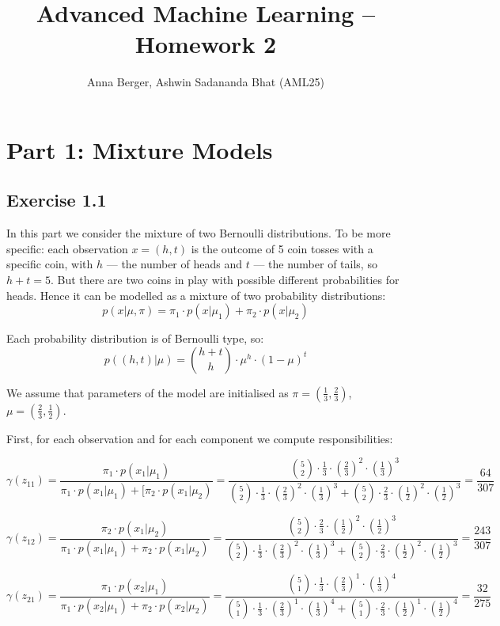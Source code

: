 \documentclass[11pt,a4paper]{article}
\title{\textbf{Advanced Machine Learning -- Homework 2}}
\author{Anna Berger, Ashwin Sadananda Bhat (AML25)}
\begin{document}
	\maketitle
	
	\section*{Part 1: Mixture Models}
	\subsection*{Exercise 1.1}
	
	In this part we consider the mixture of two Bernoulli distributions. To be more specific: each observation $x=(h, t)$ is the outcome of 5 coin tosses with a specific coin, with $h$ --- the number of heads and $t$ --- the number of tails, so $h+t=5$. But there are two coins in play with possible different probabilities for heads. Hence it can be modelled as a mixture of two probability distributions:
	$$ p(x | \mu,\pi) = \pi_1 \cdot p(x|\mu_1) + \pi_2 \cdot p(x|\mu_2) $$
	
	Each probability distribution is of Bernoulli type, so:
	$$ p((h,t)|\mu) = \binom {h+t}{h} \cdot \mu^h \cdot (1-\mu)^t$$
	
	We assume that parameters of the model are initialised as $\pi = \left(
	 \frac{1}{3}, \frac{2}{3}\right)$, $\mu = \left(
	 \frac{2}{3}, \frac{1}{2}\right)$.
	
	First, for each observation and for each component we compute responsibilities:
	
	$$ \gamma(z_{11}) = \frac{\pi_1 \cdot p(x_1|\mu_1)}{\pi_1 \cdot p(x_1|\mu_1)+[\pi_2 \cdot p(x_1|\mu_2)} = \frac{\binom {5}{2} \cdot \frac{1}{3} \cdot (\frac{2}{3})^2 \cdot (\frac{1}{3})^3}{\binom {5}{2} \cdot \frac{1}{3} \cdot (\frac{2}{3})^2 \cdot (\frac{1}{3})^3+\binom {5}{2} \cdot \frac{2}{3} \cdot (\frac{1}{2})^2 \cdot (\frac{1}{2})^3}=\frac{64}{307} $$
	
	$$ \gamma(z_{12}) = \frac{\pi_2 \cdot p(x_1|\mu_2)}{\pi_1 \cdot p(x_1|\mu_1)+\pi_2 \cdot p(x_1|\mu_2)} = \frac{\binom {5}{2} \cdot \frac{2}{3} \cdot (\frac{1}{2})^2 \cdot (\frac{1}{2})^3}{\binom {5}{2} \cdot \frac{1}{3} \cdot (\frac{2}{3})^2 \cdot (\frac{1}{3})^3+\binom {5}{2} \cdot \frac{2}{3} \cdot (\frac{1}{2})^2 \cdot (\frac{1}{2})^3}=\frac{243}{307} $$
	
	$$ \gamma(z_{21}) = \frac{\pi_1 \cdot p(x_2|\mu_1)}{\pi_1 \cdot p(x_2|\mu_1)+\pi_2 \cdot p(x_2|\mu_2)} = \frac{\binom {5}{1} \cdot \frac{1}{3} \cdot (\frac{2}{3})^1 \cdot (\frac{1}{3})^4}{\binom {5}{1} \cdot \frac{1}{3} \cdot (\frac{2}{3})^1 \cdot (\frac{1}{3})^4+\binom {5}{1} \cdot \frac{2}{3} \cdot (\frac{1}{2})^1 \cdot (\frac{1}{2})^4}=\frac{32}{275} $$
	
\end{document}
